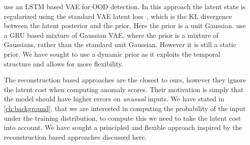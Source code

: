 \documentclass[../main.tex]{subfiles}
\begin{document}
\citet{chen2019vaelstm} use an LSTM based VAE for OOD detection. In this approach the latent state is regularized using the standard VAE latent loss~\citep{kingma2013auto}, which is the KL divergence between the latent posterior and the prior. Here the prior is a unit Gaussian.
\citet{guo2018multidimensional} use a GRU based mixture of Gaussian VAE, where the prior is a mixture of Gaussians, rather than the standard unit Gaussian. However it is still a static prior. We have sought to use a dynamic prior as it exploits the temporal structure and allows for more flexibility.

The reconstruction based approaches are the closest to ours, however they ignore the latent cost when computing anomaly scores. Their motivation is simply that the model should have higher errors on \emph{unusual} inputs. We have stated in \cref{ch:background}, that we are interested in computing the probability of the input under the training distribution, to compute this we need to take the latent cost into account. We have sought a principled and flexible approach inspired by the reconstruction based approaches discussed here. 
\end{document}
